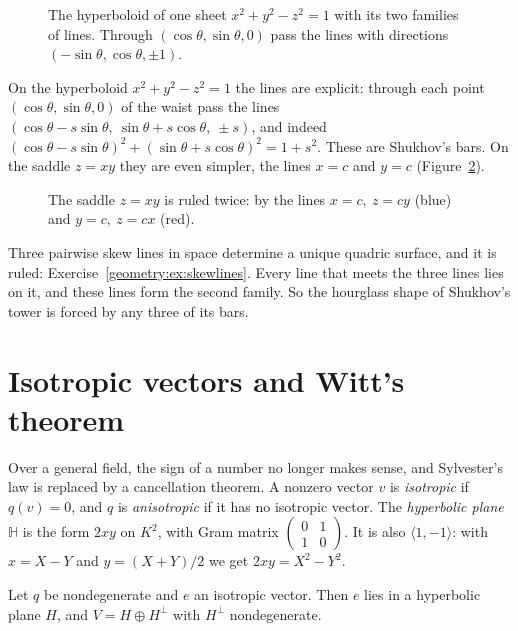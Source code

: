 \begin{figure}[ht]
\centering
{}
\caption{The hyperboloid of one sheet $x^2+y^2-z^2=1$ with its two families of lines. Through $(\cos\theta,\sin\theta,0)$ pass the lines with directions
$(-\sin\theta,\cos\theta,\pm1)$.}
\label{geometry:fig:hyperboloid}
\end{figure}

On the hyperboloid $x^2+y^2-z^2=1$ the lines are explicit: through each point $(\cos\theta,\sin\theta,0)$ of the waist pass the lines
$(\cos\theta-s\sin\theta,\ \sin\theta+s\cos\theta,\ \pm s)$, and indeed $(\cos\theta-s\sin\theta)^2+(\sin\theta+s\cos\theta)^2=1+s^2$. These are
Shukhov's bars. On the saddle $z=xy$ they are even simpler, the lines $x=c$ and $y=c$ (Figure~\ref{geometry:fig:saddle}).

\begin{figure}[ht]
\centering
{}
\caption{The saddle $z=xy$ is ruled twice: by the lines $x=c,\ z=cy$ (blue) and $y=c,\ z=cx$ (red).}
\label{geometry:fig:saddle}
\end{figure}

\begin{beauty}
Three pairwise skew lines in space determine a unique quadric surface, and it is ruled: Exercise~\ref{geometry:ex:skewlines}. Every line that meets
the three lines lies on it, and these lines form the second family. So the hourglass shape of Shukhov's tower is forced by any three of its bars.
\end{beauty}

\section{Isotropic vectors and Witt's theorem}

Over a general field, the sign of a number no longer makes sense, and Sylvester's law is replaced by a cancellation theorem. A nonzero vector $v$ is
\emph{isotropic} if $q(v)=0$, and $q$ is \emph{anisotropic} if it has no isotropic vector. The \emph{hyperbolic plane} $\mathbb H$ is the form $2xy$
on $K^2$, with Gram matrix $\begin{pmatrix}0&1\\1&0\end{pmatrix}$. It is also $\langle1,-1\rangle$: with $x=X-Y$ and $y=(X+Y)/2$ we get
$2xy=X^2-Y^2$.

\begin{lemma}\label{geometry:lem:hyperbolic}
Let $q$ be nondegenerate and $e$ an isotropic vector. Then $e$ lies in a hyperbolic plane $H$, and $V=H\oplus H^\perp$ with $H^\perp$ nondegenerate.
\end{lemma}


